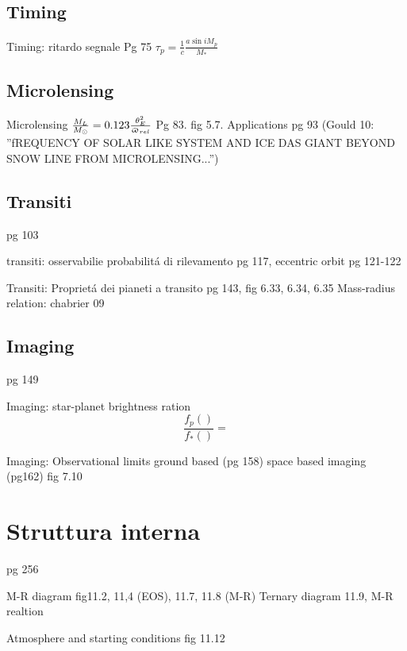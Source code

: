 \section{Timing}
\begin{workout}{Timing: ritardo segnale}
Pg 75
$\tau_p=\frac{1}{c}\frac{a\sin{i}M_p}{M_*}$
\end{workout}
\section{Microlensing}
\begin{workout}{Microlensing}
$\frac{M_L}{M_{\odot}{}}=0.123\frac{\theta_E^2}{\upvarpi_{rel}}$
Pg 83. fig 5.7. Applications pg 93
(Gould 10: ''fREQUENCY OF SOLAR LIKE SYSTEM AND ICE DAS GIANT BEYOND SNOW LINE FROM MICROLENSING...'')
\end{workout}
\section{Transiti}
pg 103
\begin{workout}{transiti: osservabilie probabilit\'a di rilevamento}
pg 117, eccentric orbit pg 121-122
\end{workout}
\begin{workout}{Transiti: Propriet\'a dei pianeti a transito}
pg 143, fig 6.33, 6.34, 6.35
Mass-radius relation: chabrier 09
\end{workout}

\section{Imaging}
pg 149
\begin{workout}{Imaging: star-planet brightness ration}
\begin{equation*}
\frac{f_p()}{f_*()}=
\end{equation*}
\end{workout}
\begin{workout}{Imaging: Observational limits}
ground based (pg 158) space based imaging (pg162)
fig 7.10
\end{workout}

\chapter{Struttura interna}

pg 256 
\begin{workout}{M-R diagram}
fig11.2, 11,4 (EOS), 11.7, 11.8 (M-R)
Ternary diagram 11.9, M-R realtion
\end{workout}

\begin{workout}{Atmosphere and starting conditions}
fig 11.12
\end{workout}
